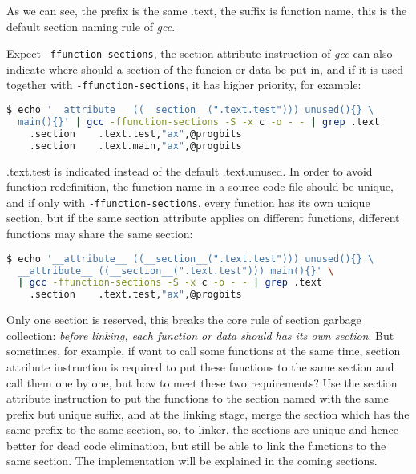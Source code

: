 \documentclass[10pt,a4paper]{article}
\begin{document}
\begin{multicols}{2}
As we can see, the prefix is the same .text, the suffix is function name, this
is the default section naming rule of {\em gcc}.

Expect {\small {\tt -ffunction-sections}}, the section attribute instruction of
{\em gcc} can also indicate where should a section of the funcion or data be put in,
and if it is used together with {\small {\tt -ffunction-sections}}, it has
higher priority, for example:

\begin{lstlisting}[language=bash,
                  commentstyle=\fontsize{7}{8}\selectfont,
                  basicstyle=\ttfamily\fontsize{7}{8}\selectfont]
$ echo '__attribute__ ((__section__(".text.test"))) unused(){} \
  main(){}' | gcc -ffunction-sections -S -x c -o - - | grep .text
	.section	.text.test,"ax",@progbits
	.section	.text.main,"ax",@progbits
\end{lstlisting}

.text.test is indicated instead of the default .text.unused. In order to avoid
function redefinition, the function name in a source code file should be
unique, and if only with {\small {\tt -ffunction-sections}}, every function has
its own unique section, but if the same section attribute applies on different
functions, different functions may share the same section:

\begin{lstlisting}[language=bash,
                  commentstyle=\fontsize{7}{8}\selectfont,
                  basicstyle=\ttfamily\fontsize{7}{8}\selectfont]
$ echo '__attribute__ ((__section__(".text.test"))) unused(){} \
  __attribute__ ((__section__(".text.test"))) main(){}' \
  | gcc -ffunction-sections -S -x c -o - - | grep .text
	.section	.text.test,"ax",@progbits
\end{lstlisting}

Only one section is reserved, this breaks the core rule of section garbage
collection: {\em before linking, each function or data should has its own
section}. But sometimes, for example, if want to call some functions at the
same time, section attribute instruction is required to put these functions to
the same section and call them one by one, but how to meet these two
requirements? Use the section attribute instruction to put the functions to the
section named with the same prefix but unique suffix, and at the linking stage,
merge the section which has the same prefix to the same section, so, to linker,
the sections are unique and hence better for dead code elimination, but still
be able to link the functions to the same section. The implementation will be
explained in the coming sections.


\end{multicols}
\end{document}
